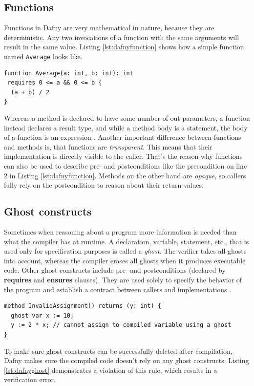 \documentclass[a4paper]{article}
\begin{document}
\subsection{Functions}
Functions in Dafny are very mathematical in nature, because they are deterministic. Any two invocations of a
function with the same arguments will result in the same value. Listing \ref{lst:dafnyfunction} shows how a simple
function named \texttt{Average} looks like.
\begin{lstlisting}[style=dafnystyle, caption={Simple function in Dafny.}, label={lst:dafnyfunction}]
function Average(a: int, b: int): int 
 requires 0 <= a && 0 <= b {
  (a + b) / 2
}
\end{lstlisting}
Whereas a method is declared to have some number of out-parameters, a function instead declares a result type,
and while a method body is a statement, the body of a function is an expression \cite{leino2023program}.
Another important difference between functions and methods is, that functions are \textit{transparent}. This means
that their implementation is directly visible to the caller. That's the reason why functions can also be used
to describe pre- and postconditions like the precondition on line 2 in Listing \ref{lst:dafnyfunction}.
Methods on the other hand are \textit{opaque}, so callers fully rely on the postcondition to reason about their return values.
\subsection{Ghost constructs}
Sometimes when reasoning about a program more information is needed than what the compiler has at runtime.
A declaration, variable, statement, etc., that is used only for specification purposes is called a \textit{ghost}.
The verifier takes all ghosts into account, whereas the compiler erases all ghosts when it produces executable code.
Other ghost constructs include pre- and postconditions (declared by \textbf{requires} and \textbf{ensures} clauses).
They are used solely to specify the behavior of the program and establish a contract between callers and implementations \cite{leino2023program}.
\begin{lstlisting}[style=dafnystyle, caption={Invalid assignment to ghost.}, label={lst:dafnyghost}]
method InvalidAssignment() returns (y: int) {
  ghost var x := 10;
  y := 2 * x; // cannot assign to compiled variable using a ghost
}
\end{lstlisting}
To make sure ghost constructs can be successfully deleted after compilation, Dafny makes sure the compiled code
doesn't rely on any ghost constructs. Listing \ref{lst:dafnyghost} demonstrates a violation of this rule, which
results in a verification error.
\end{document}
